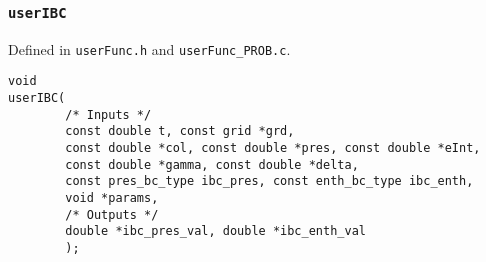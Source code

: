 \documentclass[12pt]{article}
\begin{document}
\subsubsection{\texttt{userIBC}}
\label{sssec:userIBC}

Defined in \verb=userFunc.h= and \verb=userFunc_PROB.c=.

\begin{verbatim}
void
userIBC(
        /* Inputs */
        const double t, const grid *grd,
        const double *col, const double *pres, const double *eInt,
        const double *gamma, const double *delta,
        const pres_bc_type ibc_pres, const enth_bc_type ibc_enth,
        void *params, 
        /* Outputs */
        double *ibc_pres_val, double *ibc_enth_val
        );
\end{verbatim}
\end{document}
